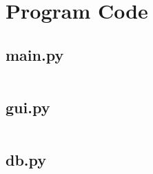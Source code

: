 \documentclass{article}
\begin{document}
			\section*{Program Code}
			\subsection*{main.py}
			\inputminted[fontsize=\footnotesize, linenos]{python}{main.py}
			\newpage

			\subsection*{gui.py}
			\inputminted[fontsize=\footnotesize, linenos]{python}{gui.py}
			\newpage

			\subsection*{db.py}
			\inputminted[fontsize=\footnotesize, linenos]{python}{db.py}
			
\end{document}
